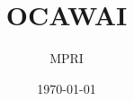 \documentclass[french,xcolor={usenames,dvipsnames}]{beamer}
\author{MPRI}
\date{\today}
\title{OCAWAI}
\begin{document}
\begin{frame}
\titlepage
\end{frame}
\end{document}
